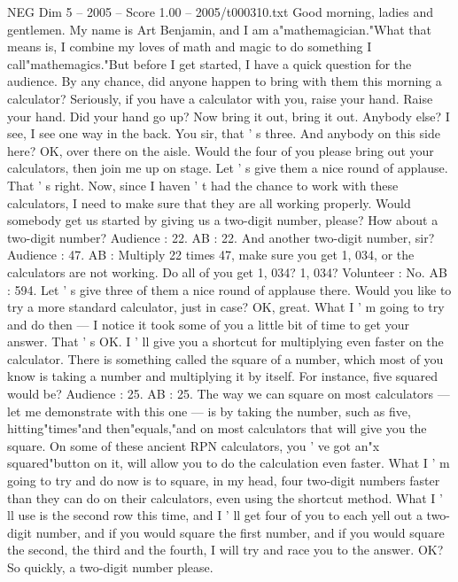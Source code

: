 \begin{textsample}{NEG Dim 5 – 2005 – Score 1.00 – 2005/t000310.txt}  \label{ex:f5_neg_074}
Good morning, ladies and gentlemen.
My name is Art Benjamin, and I am a"mathemagician."What that means is, I combine my loves of math and magic to do something I call"mathemagics."But before I get started, I have a quick question for the audience.
By any chance, did anyone happen to bring with them this morning a calculator?
Seriously, if you have a calculator with you, raise your hand.
Raise your hand.
Did your hand go up?
Now bring it out, bring it out.
Anybody else?
I see, I see one way in the back.
You sir, that ' s three.
And anybody on this side here?
OK, over there on the aisle.
Would the four of you please bring out your calculators, then join me up on stage.
Let ' s give them a nice round of applause.
That ' s right.
Now, since I haven ' t had the chance to work with these calculators, I need to make sure that they are all working properly.
Would somebody get us started by giving us a two-digit number, please?
How about a two-digit number?
Audience : 22.
AB : 22.
And another two-digit number, sir?
Audience : 47.
AB : Multiply 22 times 47, make sure you get 1, 034, or the calculators are not working.
Do all of you get 1, 034? 1, 034?
Volunteer : No.
AB : 594.
Let ' s give three of them a nice round of applause there.
Would you like to try a more standard calculator, just in case?
OK, great.
What I ' m going to try and do then — I notice it took some of you a little bit of time to get your answer.
That ' s OK.
I ' ll give you a shortcut for multiplying even faster on the calculator.
There is something called the square of a number, which most of you know is taking a number and multiplying it by itself.
For instance, five squared would be?
Audience : 25.
AB : 25.
The way we can square on most calculators — let me demonstrate with this one — is by taking the number, such as five, hitting"times"and then"equals,"and on most calculators that will give you the square.
On some of these ancient RPN calculators, you ' ve got an"x squared"button on it, will allow you to do the calculation even faster.
What I ' m going to try and do now is to square, in my head, four two-digit numbers faster than they can do on their calculators, even using the shortcut method.
What I ' ll use is the second row this time, and I ' ll get four of you to each yell out a two-digit number, and if you would square the first number, and if you would square the second, the third and the fourth, I will try and race you to the answer.
OK?
So quickly, a two-digit number please.

\end{textsample}

